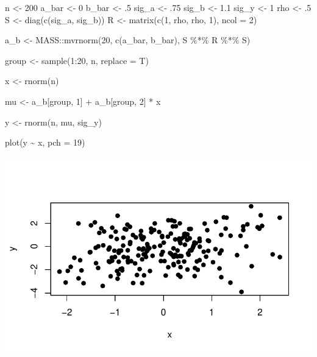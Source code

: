 \documentclass[
  letterpaper,
  DIV=11,
  numbers=noendperiod]{scrartcl}
\newenvironment{Shaded}{\begin{snugshade}}{\end{snugshade}}
\newcommand{\AttributeTok}[1]{\textcolor[rgb]{0.40,0.45,0.13}{#1}}
\newcommand{\DecValTok}[1]{\textcolor[rgb]{0.68,0.00,0.00}{#1}}
\newcommand{\FloatTok}[1]{\textcolor[rgb]{0.68,0.00,0.00}{#1}}
\newcommand{\FunctionTok}[1]{\textcolor[rgb]{0.28,0.35,0.67}{#1}}
\newcommand{\NormalTok}[1]{\textcolor[rgb]{0.00,0.23,0.31}{#1}}
\newcommand{\OtherTok}[1]{\textcolor[rgb]{0.00,0.23,0.31}{#1}}
\newcommand{\SpecialCharTok}[1]{\textcolor[rgb]{0.37,0.37,0.37}{#1}}
\begin{document}
\begin{Shaded}
\begin{Highlighting}[]
\NormalTok{n }\OtherTok{\textless{}{-}} \DecValTok{200}
\NormalTok{a\_bar }\OtherTok{\textless{}{-}} \DecValTok{0}
\NormalTok{b\_bar }\OtherTok{\textless{}{-}}\NormalTok{ .}\DecValTok{5}
\NormalTok{sig\_a }\OtherTok{\textless{}{-}}\NormalTok{ .}\DecValTok{75}
\NormalTok{sig\_b }\OtherTok{\textless{}{-}} \FloatTok{1.1}
\NormalTok{sig\_y }\OtherTok{\textless{}{-}} \DecValTok{1}
\NormalTok{rho }\OtherTok{\textless{}{-}}\NormalTok{ .}\DecValTok{5}
\NormalTok{S }\OtherTok{\textless{}{-}} \FunctionTok{diag}\NormalTok{(}\FunctionTok{c}\NormalTok{(sig\_a, sig\_b))}
\NormalTok{R }\OtherTok{\textless{}{-}} \FunctionTok{matrix}\NormalTok{(}\FunctionTok{c}\NormalTok{(}\DecValTok{1}\NormalTok{, rho, rho, }\DecValTok{1}\NormalTok{), }\AttributeTok{ncol =} \DecValTok{2}\NormalTok{)}

\NormalTok{a\_b }\OtherTok{\textless{}{-}}\NormalTok{ MASS}\SpecialCharTok{::}\FunctionTok{mvrnorm}\NormalTok{(}\DecValTok{20}\NormalTok{, }\FunctionTok{c}\NormalTok{(a\_bar, b\_bar), S }\SpecialCharTok{\%*\%}\NormalTok{ R }\SpecialCharTok{\%*\%}\NormalTok{ S)}

\NormalTok{group }\OtherTok{\textless{}{-}} \FunctionTok{sample}\NormalTok{(}\DecValTok{1}\SpecialCharTok{:}\DecValTok{20}\NormalTok{, n, }\AttributeTok{replace =}\NormalTok{ T)}

\NormalTok{x }\OtherTok{\textless{}{-}} \FunctionTok{rnorm}\NormalTok{(n)}

\NormalTok{mu }\OtherTok{\textless{}{-}}\NormalTok{ a\_b[group, }\DecValTok{1}\NormalTok{] }\SpecialCharTok{+}\NormalTok{ a\_b[group, }\DecValTok{2}\NormalTok{] }\SpecialCharTok{*}\NormalTok{ x}

\NormalTok{y }\OtherTok{\textless{}{-}} \FunctionTok{rnorm}\NormalTok{(n, mu, sig\_y)}

\FunctionTok{plot}\NormalTok{(y }\SpecialCharTok{\textasciitilde{}}\NormalTok{ x, }\AttributeTok{pch =} \DecValTok{19}\NormalTok{)}
\end{Highlighting}
\end{Shaded}

\includegraphics{varying_intercepts_varying_slopes_files/figure-pdf/unnamed-chunk-4-1.pdf}
\end{document}

